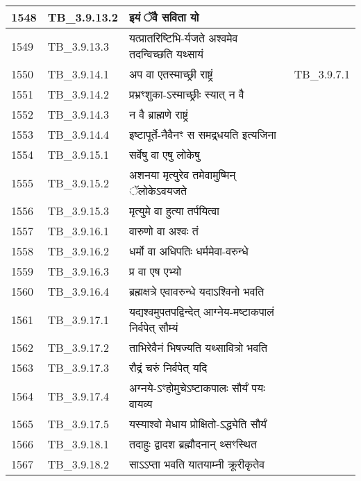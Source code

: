 \documentclass[17pt]{extarticle}
\begin{document}
\begin{longtable}{||p{0.4in}||p{0.9in}||p{4.0in}||p{0.9in}||}
        \hline
            1548 & TB\_3.9.13.2 & इयं ॅवै सविता यो &      \\
        \hline
            1549 & TB\_3.9.13.3 & यत्प्रातरिष्टिभि{-}र्यजते अश्वमेव तदन्विच्छति यथ्सायं &      \\
        \hline
            1550 & TB\_3.9.14.1 & अप वा एतस्माच्छ्री राष्ट्रं & TB\_3.9.7.1        \\
        \hline
            1551 & TB\_3.9.14.2 & प्रभ्रꣳशुका{-}ऽस्माच्छ्रीः स्यात् न वै &      \\
        \hline
            1552 & TB\_3.9.14.3 & न वै ब्राह्मणे राष्ट्रं &      \\
        \hline
            1553 & TB\_3.9.14.4 & इष्टापूर्ते{-}नैवैनꣳ स समद्र्धयति इत्यजिना &      \\
        \hline
            1554 & TB\_3.9.15.1 & सर्वेषु वा एषु लोकेषु &      \\
        \hline
            1555 & TB\_3.9.15.2 & अशनया मृत्युरेव तमेवामुष्मिन् ॅलोकेऽवयजते &      \\
        \hline
            1556 & TB\_3.9.15.3 & मृत्युमे वा हुत्या तर्पयित्वा &      \\
        \hline
            1557 & TB\_3.9.16.1 & वारुणो वा अश्वः तं &      \\
        \hline
            1558 & TB\_3.9.16.2 & धर्मो वा अधिपतिः धर्ममेवा{-}वरुन्धे &      \\
        \hline
            1559 & TB\_3.9.16.3 & प्र वा एष एभ्यो &      \\
        \hline
            1560 & TB\_3.9.16.4 & ब्रह्मक्षत्रे एवावरुन्धे यदाऽश्विनो भवति &      \\
        \hline
            1561 & TB\_3.9.17.1 & यद्यश्वमुपतपद्विन्देत् आग्नेय{-}मष्टाकपालं निर्वपेत् सौम्यं &      \\
        \hline
            1562 & TB\_3.9.17.2 & ताभिरेवैनं भिषज्यति यथ्सावित्रो भवति &      \\
        \hline
            1563 & TB\_3.9.17.3 & रौद्रं चरुं निर्वपेत् यदि &      \\
        \hline
            1564 & TB\_3.9.17.4 & अग्नये{-}ऽꣳहोमुचेऽष्टाकपालः सौर्यं पयः वायव्य &      \\
        \hline
            1565 & TB\_3.9.17.5 & यस्याश्वो मेधाय प्रोक्षितो{-}ऽद्ध्येति सौर्यं &      \\
        \hline
            1566 & TB\_3.9.18.1 & तदाहुः द्वादश ब्रह्मौदनान् थ्सꣳस्थित &      \\
        \hline
            1567 & TB\_3.9.18.2 & साऽऽप्ता भवति यातयाम्नी क्रूरीकृतेव &      \\

\end{longtable}
\end{document}
